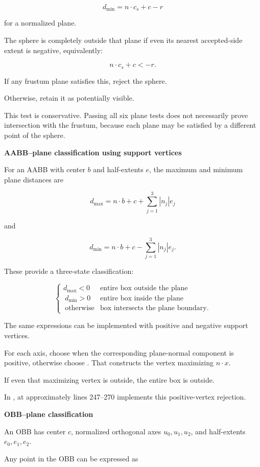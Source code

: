 \[
d_{\min}=n\cdot c_s+c-r
\]

for a normalized plane.

The sphere is completely outside that plane if even its nearest accepted-side extent is negative, equivalently:

\[
n\cdot c_s+c<-r.
\]

If any frustum plane satisfies this, reject the sphere.

Otherwise, retain it as potentially visible.

This test is conservative. Passing all six plane tests does not necessarily prove intersection with the frustum, because each plane may be satisfied by a different point of the sphere.

\textbf{AABB--plane classification using support vertices}

For an AABB with center \(b\) and half-extents \(e\), the maximum and minimum plane distances are

\[
d_{\max}=n\cdot b+c+ \sum_{j=1}^3|n_j|e_j
\]

and

\[
d_{\min}=n\cdot b+c- \sum_{j=1}^3|n_j|e_j.
\]

These provide a three-state classification:

\[
\begin{cases} d_{\max}<0 & \text{entire box outside the plane}\\\ d_{\min}>0 & \text{entire box inside the plane}\\\ \text{otherwise} & \text{box intersects the plane boundary}. \end{cases}
\]

The same expressions can be implemented with positive and negative support vertices.

For each axis, choose  when the corresponding plane-normal component is positive, otherwise choose . That constructs the vertex maximizing \(n\cdot x\).

If even that maximizing vertex is outside, the entire box is outside.

In ,  at approximately lines 247--270 implements this positive-vertex rejection.

\textbf{OBB--plane classification}

An OBB has center \(c\), normalized orthogonal axes \(u_0,u_1,u_2\), and half-extents \(e_0,e_1,e_2\).

Any point in the OBB can be expressed as

